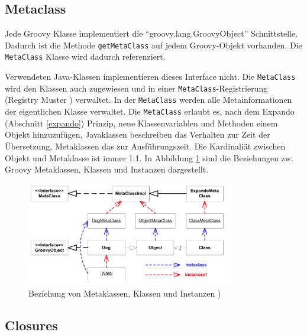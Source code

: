 \documentclass[11pt,english,ngerman, headsepline]{scrreprt}
\begin{document}
 \subsection{Metaclass}\label{Metaclass}
 
Jede Groovy Klasse implementiert die ``groovy.lang.GroovyObject''
 Schnittstelle.
Dadurch ist die Methode \texttt{getMetaClass} auf jedem Groovy-Objekt
vorhanden.
Die \texttt{MetaClass} Klasse wird dadurch referenziert.


Verwendeten Java-Klassen implementieren dieses Interface nicht. Die 
\texttt{MetaClass} wird den Klassen auch zugewiesen und in einer
\texttt{MetaClass}-Registrierung (Registry Muster \cite{fowler2003patterns})
verwaltet.
In der \texttt{MetaClass} werden alle Metainformationen der eigentlichen Klasse
verwaltet. Die \texttt{MetaClass} erlaubt es, nach dem Expando (Abschnitt
\ref{expando}) Prinzip, neue Klassenvariablen und Methoden einem Objekt
hinzuzufügen.
Javaklassen beschreiben das Verhalten zur Zeit der Übersetzung, Metaklassen
das zur Ausführungszeit.
Die Kardinaliät zwischen Objekt und Metaklasse ist immer 1:1.
In Abbildung \ref{groovyMetaclassDiagram} sind die Beziehungen zw. Groovy
Metaklassen, Klassen und Instanzen dargestellt. 

\begin{figure}[h!]
	\begin{center}
	\includegraphics[width=0.8\textwidth]{pics/groovyMetaklassen}
	\end{center}
	\caption{Beziehung von Metaklassen, Klassen und Instanzen \cite{mpInGroovy})}
	\label{groovyMetaclassDiagram}
\end{figure}

\subsection{Closures}
\end{document}
